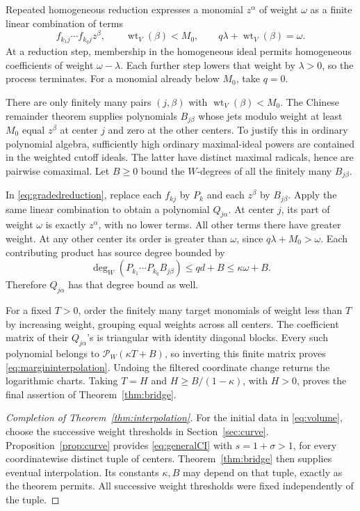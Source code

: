\documentclass[11pt]{article}
\theoremstyle{definition}
\theoremstyle{remark}
\newcommand{\wt}{\operatorname{wt}}
\newcommand{\Pcal}{\mathcal P}
\numberwithin{equation}{section}
\begin{document}
Repeated homogeneous reduction expresses a monomial \(z^\alpha\)
of weight \(\omega\) as a finite linear combination of terms
\begin{equation}\label{eq:gradedreduction}
 f_{k_1j}\cdots f_{k_qj}z^\beta,
 \qquad \wt_V(\beta)<M_0,\qquad
 q\lambda+\wt_V(\beta)=\omega.
\end{equation}
At a reduction step, membership in the homogeneous ideal permits
homogeneous coefficients of weight \(\omega-\lambda\).
Each further step lowers that weight by \(\lambda>0\), so the
process terminates. For a monomial already below \(M_0\), take
\(q=0\).

There are only finitely many pairs \((j,\beta)\) with
\(\wt_V(\beta)<M_0\). The Chinese remainder theorem supplies
polynomials \(B_{j\beta}\) whose jets modulo weight at least
\(M_0\) equal \(z^\beta\) at center \(j\) and zero at the other
centers. To justify this in ordinary polynomial algebra, sufficiently
high ordinary maximal-ideal powers are contained in the weighted
cutoff ideals. The latter have distinct maximal radicals, hence are
pairwise comaximal. Let \(B\ge0\) bound the \(W\)-degrees of all
the finitely many \(B_{j\beta}\).

In \eqref{eq:gradedreduction}, replace each \(f_{kj}\) by \(P_k\)
and each \(z^\beta\) by \(B_{j\beta}\). Apply the same linear
combination to obtain a polynomial \(Q_{j\alpha}\). At center \(j\),
its part of weight \(\omega\) is exactly \(z^\alpha\), with no
lower terms. All other terms there have greater weight. At any other
center its order is greater than \(\omega\), since
\(q\lambda+M_0>\omega\). Each contributing product has source degree
bounded by
\[
 \deg_W(P_{k_1}\cdots P_{k_q}B_{j\beta})\le qd+B\le\kappa\omega+B.
\]
Therefore \(Q_{j\alpha}\) has that degree bound as well.

For a fixed \(T>0\), order the finitely many target monomials of
weight less than \(T\) by increasing weight, grouping equal weights
across all centers. The coefficient matrix of their
\(Q_{j\alpha}\)'s is triangular with identity diagonal blocks.
Every such polynomial belongs to \(\Pcal_W(\kappa T+B)\), so
inverting this finite matrix proves \eqref{eq:margininterpolation}.
Undoing the filtered coordinate change returns the logarithmic charts.
Taking \(T=H\) and \(H\ge B/(1-\kappa)\), with \(H>0\), proves
the final assertion of Theorem~\ref{thm:bridge}.

\begin{proof}[Completion of Theorem~\ref{thm:interpolation}]
For the initial data in \eqref{eq:volume}, choose the successive
weight thresholds in Section~\ref{sec:curve}. Proposition~\ref{prop:curve}
provides \eqref{eq:generalCI} with \(s=1+\sigma>1\), for every
coordinatewise distinct tuple of centers. Theorem~\ref{thm:bridge}
then supplies eventual interpolation. Its constants \(\kappa,B\)
may depend on that tuple, exactly as the theorem permits. All
successive weight thresholds were fixed independently of the tuple.
\end{proof}
\end{document}
